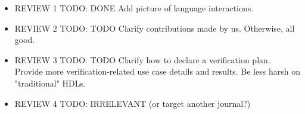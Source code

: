\documentclass[conference]{IEEEtran}
\newcommand{\todo}[1]{{\color{olive} TODO: #1}}
\newcommand{\martin}[1]{{\color{blue} Martin: #1}}
\begin{document}
\begin{itemize}
    \item REVIEW 1 \todo{DONE} Add picture of language interactions.
    \item REVIEW 2 \todo{TODO} Clarify contributions made by us. Otherwise, all good.
    \item REVIEW 3 \todo{TODO} Clarify how to declare a verification plan. Provide more verification-related use case details and results. Be less harsh on "traditional" HDLs.
    \item REVIEW 4 \todo{IRRELEVANT (or target another journal?)}
\end{itemize}


\end{document}
